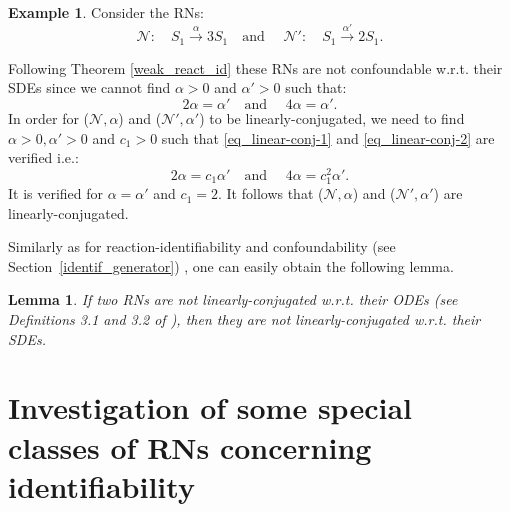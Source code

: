 \documentclass[10pt,a4paper]{amsart}
\newtheorem{lemma}[theorem]{Lemma}
\theoremstyle{definition}
\newtheorem{example}[theorem]{Example}
\theoremstyle{remark}
\theoremstyle{consequence}
\numberwithin{equation}{section}
\begin{document}
\begin{example}
   Consider the RNs:
$$\mathcal{N}:\quad S_1\xrightarrow{\alpha}  3S_1 \quad \text{and  } \quad\mathcal{N'}: \quad S_1\xrightarrow{\alpha'}  2S_1 .$$

Following Theorem \ref{weak_react_id}
these RNs  are not confoundable w.r.t. their SDEs
 since we cannot find $\alpha>0$ and $\alpha'>0$ such that:
\begin{equation*}
    2\alpha =  \alpha' \quad \text{and  } \quad  4\alpha =  \alpha' .
\end{equation*}
In order for ($\mathcal{N},\alpha$) and ($\mathcal{N'},\alpha'$) to be linearly-conjugated, we need to find $\alpha>0, \alpha'>0$ and $c_1>0$ such that \ref{eq_linear-conj-1} and \ref{eq_linear-conj-2} are verified i.e.: 
\begin{equation*}
    2\alpha =  c_1 \alpha' \quad \text{and  } \quad  4\alpha =  c_1^2 \alpha' .
\end{equation*}
It is verified for $\alpha = \alpha'$ and $c_1=2$. It follows that ($\mathcal{N},\alpha$) and ($\mathcal{N'},\alpha'$) are linearly-conjugated. 
\end{example}
Similarly as for reaction-identifiability and confoundability ({see Section~\ref{identif_generator}}) , one can easily obtain the following lemma.
\begin{lemma}

If two RNs are not linearly-conjugated w.r.t. their ODEs (see Definitions 3.1 and 3.2 of \cite{johnston2011linear}), then they are not linearly-conjugated w.r.t. their SDEs.
\end{lemma}



\section{Investigation of some special classes of RNs concerning identifiability}
\end{document}

